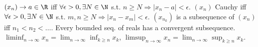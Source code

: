  $(x_n) \to a \in \R$ iff $\forall \epsilon > 0, \exists N \in \N$
s.t. $n \ge N \Rightarrow |x_n - a| < \epsilon$.
 $(x_n)$ Cauchy iff $\forall \epsilon > 0, \exists N \in \N$
s.t. $m, n \ge N \Rightarrow |x_n - x_m| < \epsilon$.
 $(x_{n_k})$ is a subsequence of $(x_n)$ iff $n_1 < n_2 < \dots$.
 Every bounded seq. of reals has a convergent subsequence.
 $\liminf_{n \to \infty} x_n = \lim_{n \to \infty} \inf_{k \ge n} x_k$,
$\limsup_{n \to \infty} x_n = \lim_{n \to \infty} \sup_{k \ge n} x_k$.
